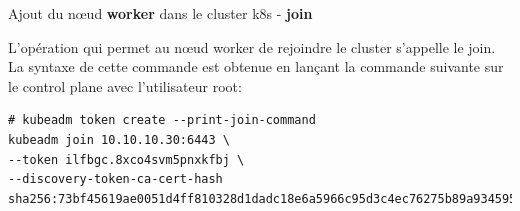 
\begin{frame}[shrink=8,fragile]{Ajout du n{\oe}ud \textbf{worker} dans le cluster k8s - \textbf{join}}

   L'opération qui permet au n{\oe}ud worker de rejoindre le cluster s'appelle le join.\\
   La syntaxe de cette commande est obtenue en lançant la commande suivante sur le control plane avec l'utilisateur root:

\begin{tiny}
\begin{Verbatim}[commandchars=\&\@\@]
# kubeadm token create --print-join-command
kubeadm join 10.10.10.30:6443 \
--token ilfbgc.8xco4svm5pnxkfbj \
--discovery-token-ca-cert-hash sha256:73bf45619ae0051d4ff810328d1dadc18e6a5966c95d3c4ec76275b89a934595 
\end{Verbatim}
\end{tiny}

\end{frame}


